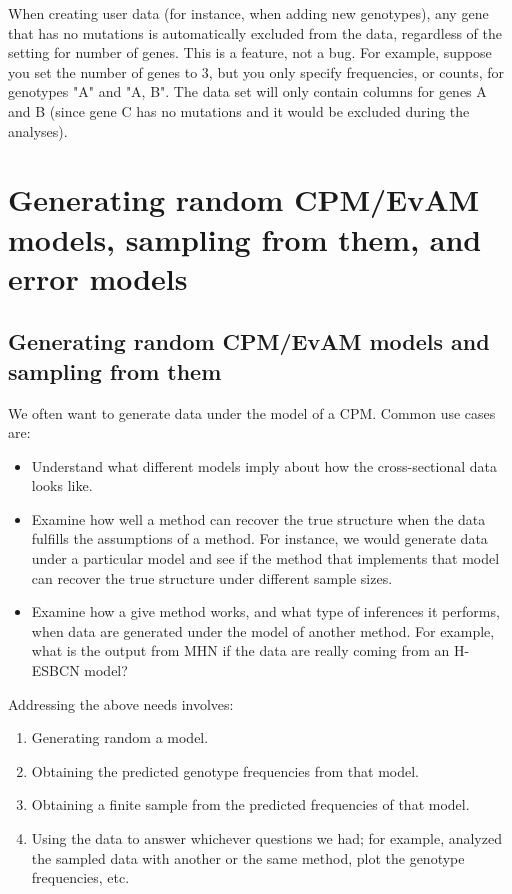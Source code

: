 \documentclass[a4paper,11pt]{article}
\begin{document}
 When creating user data (for instance, when adding new genotypes), any gene that has no mutations is automatically excluded from the data, regardless of the setting for number of genes. This is a feature, not a bug. For example, suppose you set the number of genes to 3, but you only specify frequencies, or counts, for genotypes "A" and "A, B". The data set will only contain columns for genes A and B (since gene C has no mutations and it would be excluded during the analyses).


\section{Generating random CPM/EvAM models, sampling from them, and error models}\label{sec:random_evam}


\subsection{Generating random CPM/EvAM models and sampling from them}\label{subsec:random_evam}
We often want to generate data under the model of a CPM. Common use cases are:

\begin{itemize}
\item Understand what different models imply about how the cross-sectional data looks like.

\item Examine how well a method can recover the true structure when the data fulfills the assumptions of a method. For instance, we would generate data under a particular model and see if the method that implements that model can recover the true structure under different sample sizes.

\item Examine how a give method works, and what type of inferences it performs, when data are generated under the model of another method. For example, what is the output from MHN if the data are really coming from an H-ESBCN model?
\end{itemize}


Addressing the above needs involves:


\begin{enumerate}
\item Generating random a model.
 
\item Obtaining the predicted genotype frequencies from that model.
 
\item Obtaining a finite sample from the predicted frequencies of that model.
  
\item Using the data to answer whichever questions we had; for example, analyzed the sampled data with another or the same method, plot the genotype frequencies, etc.
  
\end{enumerate}
\end{document}
